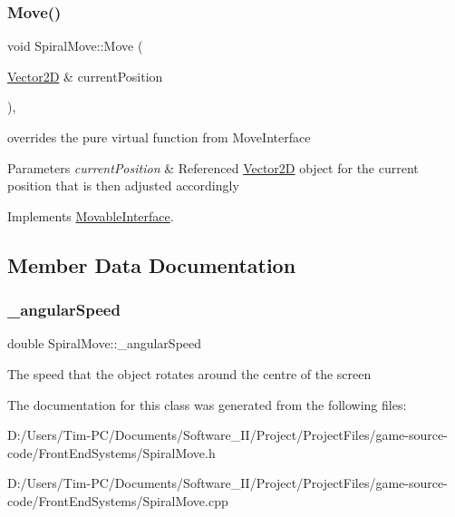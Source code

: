 \subsubsection{\texorpdfstring{Move()}{Move()}}
{\footnotesize\ttfamily void Spiral\+Move\+::\+Move (\begin{DoxyParamCaption}\item[{\hyperlink{class_vector2_d}{Vector2D} \&}]{current\+Position }\end{DoxyParamCaption})\hspace{0.3cm}{\ttfamily [override]}, {\ttfamily [virtual]}}



overrides the pure virtual function from Move\+Interface 


\begin{DoxyParams}{Parameters}
{\em current\+Position} & Referenced \hyperlink{class_vector2_d}{Vector2D} object for the current position that is then adjusted accordingly \\
\hline
\end{DoxyParams}


Implements \hyperlink{class_movable_interface_a899cc1c78eacbee13b906c6770e7f025}{Movable\+Interface}.



\subsection{Member Data Documentation}
\mbox{\label{class_spiral_move_a50cae711a780fdf56fffcb279df63f37}} 
\subsubsection{\texorpdfstring{\+\_\+angular\+Speed}{\_angularSpeed}}
{\footnotesize\ttfamily double Spiral\+Move\+::\+\_\+angular\+Speed\hspace{0.3cm}{\ttfamily [private]}}

The speed that the object rotates around the centre of the screen 

The documentation for this class was generated from the following files\+:\begin{DoxyCompactItemize}
\item 
D\+:/\+Users/\+Tim-\/\+P\+C/\+Documents/\+Software\+\_\+\+I\+I/\+Project/\+Project\+Files/game-\/source-\/code/\+Front\+End\+Systems/Spiral\+Move.\+h\item 
D\+:/\+Users/\+Tim-\/\+P\+C/\+Documents/\+Software\+\_\+\+I\+I/\+Project/\+Project\+Files/game-\/source-\/code/\+Front\+End\+Systems/Spiral\+Move.\+cpp\end{DoxyCompactItemize}
